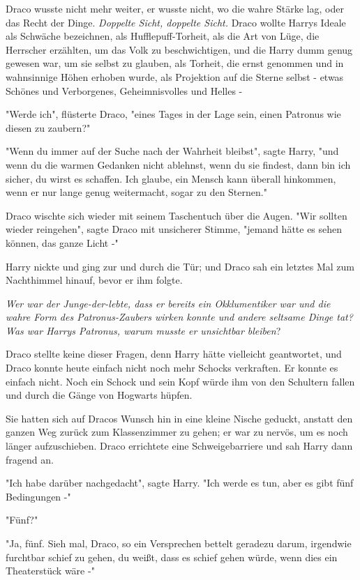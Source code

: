 {Draco wusste nicht mehr weiter, er wusste nicht, wo die wahre Stärke lag, oder das Recht der Dinge. \emph{Doppelte Sicht, doppelte Sicht.} Draco wollte Harrys Ideale als Schwäche bezeichnen, als Hufflepuff-Torheit, als die Art von Lüge, die Herrscher erzählten, um das Volk zu beschwichtigen, und die Harry dumm genug gewesen war, um sie selbst zu glauben, als Torheit, die ernst genommen und in wahnsinnige Höhen erhoben wurde, als Projektion auf die Sterne selbst - etwas Schönes und Verborgenes, Geheimnisvolles und Helles -

"Werde ich", flüsterte Draco, "eines Tages in der Lage sein, einen Patronus wie diesen zu zaubern?"

"Wenn du immer auf der Suche nach der Wahrheit bleibst", sagte Harry, "und wenn du die warmen Gedanken nicht ablehnst, wenn du sie findest, dann bin ich sicher, du wirst es schaffen. Ich glaube, ein Mensch kann überall hinkommen, wenn er nur lange genug weitermacht, sogar zu den Sternen."

Draco wischte sich wieder mit seinem Taschentuch über die Augen. "Wir sollten wieder reingehen", sagte Draco mit unsicherer Stimme, "jemand hätte es sehen können, das ganze Licht -"

Harry nickte und ging zur und durch die Tür; und Draco sah ein letztes Mal zum Nachthimmel hinauf, bevor er ihm folgte.

\emph{Wer war der Junge-der-lebte, dass er bereits ein Okklumentiker war und die wahre Form des Patronus-Zaubers wirken konnte und andere seltsame Dinge tat? Was war Harrys Patronus, warum musste er unsichtbar bleiben}?

Draco stellte keine dieser Fragen, denn Harry hätte vielleicht geantwortet, und Draco konnte heute einfach nicht noch mehr Schocks verkraften. Er konnte es einfach nicht. Noch ein Schock und sein Kopf würde ihm von den Schultern fallen und durch die Gänge von Hogwarts hüpfen.

Sie hatten sich auf Dracos Wunsch hin in eine kleine Nische geduckt, anstatt den ganzen Weg zurück zum Klassenzimmer zu gehen; er war zu nervös, um es noch länger aufzuschieben. Draco errichtete eine Schweigebarriere und sah Harry dann fragend an.

"Ich habe darüber nachgedacht", sagte Harry. "Ich werde es tun, aber es gibt fünf Bedingungen -"

"Fünf?"

"Ja, fünf. Sieh mal, Draco, so ein Versprechen bettelt geradezu darum, irgendwie furchtbar schief zu gehen, du weißt, dass es schief gehen würde, wenn dies ein Theaterstück wäre -"

}
